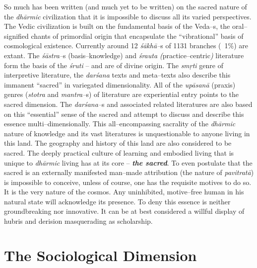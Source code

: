 So much has been written (and much yet to be written) on the sacred nature of the \textit{dhārmic} civilization that it is impossible to discuss all its varied perspectives. The Vedic civilization is built on the fundamental basis of the Veda–s, the oral–signified chants of primordial origin that encapsulate the “vibrational” basis of cosmological existence. Currently around 12 \textit{śākhā–}s of 1131 branches (~1\%) are extant. The \textit{śāstra–}s (basis–knowledge) and \textit{śrauta (}practice–centric\textit{)} literature form the basis of the \textit{śruti} – and are of divine origin. The \textit{smṛti} genre of interpretive literature, the \textit{darśana} texts and meta–texts also describe this immanent “sacred” in variegated dimensionality. All of the \textit{upāsanā} (praxis) genres (\textit{stotra} and \textit{mantra–}s) of literature are experiential entry points to the sacred dimension. The \textit{darśana–}s and associated related literatures are also based on this “essential” sense of the sacred and attempt to discuss and describe this essence multi–dimensionally. This all–encompassing sacrality of the \textit{dhārmic} nature of knowledge and its vast literatures is unquestionable to anyone living in this land. The geography and history of this land are also considered to be sacred. The deeply practical culture of learning and embodied living that is unique to \textit{dhārmic} living has at its core – \textbf{\textit{the sacred}}. To even postulate that the sacred is an externally manifested man–made attribution (the nature of \textit{pavitratā}) is impossible to conceive, unless of course, one has the requisite motives to do so. It is the very nature of the cosmos. Any uninhibited, motive–free human in his natural state will acknowledge its presence. To deny this essence is neither groundbreaking nor innovative. It can be at best considered a willful display of hubris and derision masquerading as scholarship.


\section*{The Sociological Dimension}

